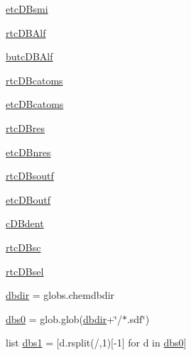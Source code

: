 \begin{DoxyCompactItemize}
\hyperlink{classmolSimplify_1_1Classes_1_1mGUI_1_1mGUI_a22a5bdf9f52d48b8c95b18bade4da2a2}{etc\+D\+Bsmi}
\item 
\hyperlink{classmolSimplify_1_1Classes_1_1mGUI_1_1mGUI_ae78584fd7e233766efa20119abbc8491}{rtc\+D\+B\+Alf}
\item 
\hyperlink{classmolSimplify_1_1Classes_1_1mGUI_1_1mGUI_a06396a09031829c66fa077189c6a40d4}{butc\+D\+B\+Alf}
\item 
\hyperlink{classmolSimplify_1_1Classes_1_1mGUI_1_1mGUI_ad5783af200f9f284580ee1f10675b25d}{rtc\+D\+Bcatoms}
\item 
\hyperlink{classmolSimplify_1_1Classes_1_1mGUI_1_1mGUI_a497b6bcee1a511d3ac15b0af798dd8f9}{etc\+D\+Bcatoms}
\item 
\hyperlink{classmolSimplify_1_1Classes_1_1mGUI_1_1mGUI_adf767d070d494c6840465a479315506a}{rtc\+D\+Bres}
\item 
\hyperlink{classmolSimplify_1_1Classes_1_1mGUI_1_1mGUI_a888e8e0c62943ca6956cad1be418eeea}{etc\+D\+Bnres}
\item 
\hyperlink{classmolSimplify_1_1Classes_1_1mGUI_1_1mGUI_a6a39d0e8dff0d4de076d35e211033e7f}{rtc\+D\+Bsoutf}
\item 
\hyperlink{classmolSimplify_1_1Classes_1_1mGUI_1_1mGUI_a4ecd38c4fadf008fa2a3f012fb183c69}{etc\+D\+Boutf}
\item 
\hyperlink{classmolSimplify_1_1Classes_1_1mGUI_1_1mGUI_a65ebb348ec693ad1d002dbd49d36103d}{c\+D\+Bdent}
\item 
\hyperlink{classmolSimplify_1_1Classes_1_1mGUI_1_1mGUI_ac71a53ce15f1427b409b27dbc8c955bf}{rtc\+D\+Bsc}
\item 
\hyperlink{classmolSimplify_1_1Classes_1_1mGUI_1_1mGUI_a1596c5bfc933b891d6ba1d5f0232a998}{rtc\+D\+Bsel}
\item 
\hyperlink{classmolSimplify_1_1Classes_1_1mGUI_1_1mGUI_a93158c1b3fb567f057a2c4de679c2df1}{dbdir} = globs.\+chemdbdir
\item 
\hyperlink{classmolSimplify_1_1Classes_1_1mGUI_1_1mGUI_a4612f44657e3a22b17f417e16ebb01f8}{dbs0} = glob.\+glob(\hyperlink{classmolSimplify_1_1Classes_1_1mGUI_1_1mGUI_a93158c1b3fb567f057a2c4de679c2df1}{dbdir}+\char`\"{}/$\ast$.sdf\char`\"{})
\item 
list \hyperlink{classmolSimplify_1_1Classes_1_1mGUI_1_1mGUI_a83690ec49c577263f54a274b8e01853c}{dbs1} = \mbox{[}d.\+rsplit(\textquotesingle{}/\textquotesingle{},1)\mbox{[}-\/1\mbox{]} for d in \hyperlink{classmolSimplify_1_1Classes_1_1mGUI_1_1mGUI_a4612f44657e3a22b17f417e16ebb01f8}{dbs0}\mbox{]}
\item 

\end{DoxyCompactItemize}
